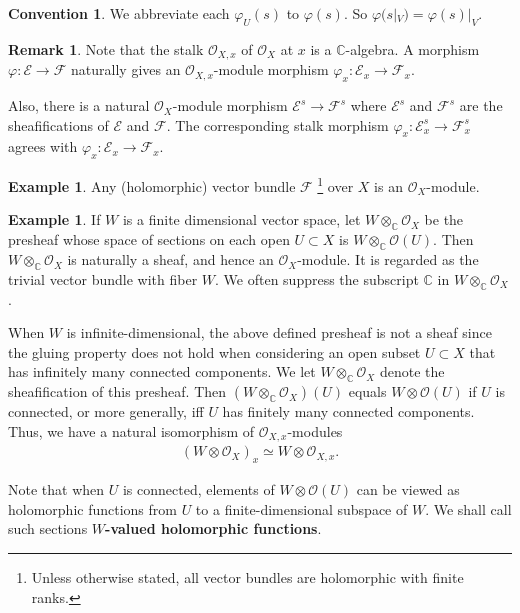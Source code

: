 \documentclass[12pt,a4paper,notitlepage]{article}
\theoremstyle{definition}
\newtheorem{eg}[df]{Example}
\newtheorem{rem}[df]{Remark}
\newtheorem{cv}[df]{Convention}
\theoremstyle{plain}
\newcommand{\scr}{\mathscr}
\newcommand{\Cbb}{\mathbb C}
\numberwithin{equation}{section}
\begin{document}
\begin{cv}
	We abbreviate each $\varphi_U(s)$ to $\varphi(s)$. So $\varphi(s|_V)=\varphi(s)|_V$.
\end{cv}


\begin{rem}
	Note that the stalk $\scr O_{X,x}$ of $\scr O_X$ at $x$ is a $\Cbb$-algebra. A morphism $\varphi:\scr E\rightarrow\scr F$ naturally gives an  $\scr O_{X,x}$-module morphism $\varphi_x:\scr E_x\rightarrow\scr F_x$. 
	
	Also, there is a natural $\scr O_X$-module morphism $\scr E^s\rightarrow\scr F^s$ where $\scr E^s$ and $\scr F^s$ are the sheafifications of $\scr E$ and $\scr F$. The corresponding stalk morphism $\varphi_x:\scr E^s_x\rightarrow\scr F^s_x$ agrees with $\varphi_x:\scr E_x\rightarrow\scr F_x$.
\end{rem}


\begin{eg}
	Any (holomorphic) vector bundle $\scr F$ \footnote{Unless otherwise stated, all vector bundles are holomorphic with finite ranks.} over $X$ is an $\scr O_X$-module. 
\end{eg}


\begin{eg}
	If $W$ is a finite dimensional  vector space, let $W\otimes_\Cbb\scr O_X$ be the presheaf whose space of sections on each open $U\subset X$ is $W\otimes_\Cbb\scr O(U)$. Then $W\otimes_\Cbb\scr O_X$ is naturally a sheaf, and hence an $\scr O_X$-module. It is regarded as the trivial vector bundle with fiber $W$. We often suppress the subscript $\Cbb$ in $W\otimes_\Cbb\scr O_X$.
	
When $W$ is infinite-dimensional, the above defined presheaf is not a sheaf since the gluing property does not hold  when considering an open subset $U\subset X$ that has infinitely many connected components. 	 We let $W\otimes_\Cbb\scr O_X$ denote the sheafification of this presheaf. Then $(W\otimes_\Cbb\scr O_X)(U)$ equals $W\otimes\scr O(U)$ if $U$ is connected, or more generally, iff $U$ has finitely many connected components. Thus, we have a natural isomorphism of $\scr O_{X,x}$-modules
\begin{align*}
(W\otimes\scr O_X)_x\simeq W\otimes\scr O_{X,x}.	
\end{align*}

Note that when $U$ is connected, elements of $W\otimes\scr O(U)$ can be viewed as holomorphic functions from $U$ to a finite-dimensional subspace of $W$. We shall call such sections \textbf{$W$-valued holomorphic functions}.  \hfill\qedsymbol
\end{eg}
\end{document}

